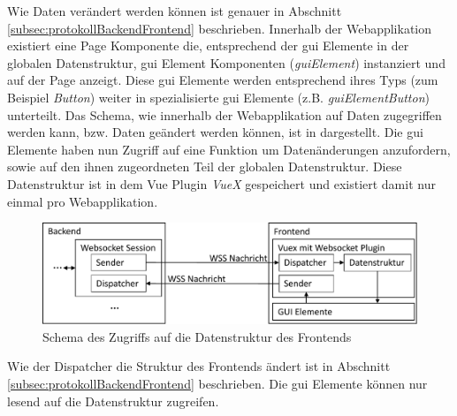 Wie Daten verändert werden können ist genauer in Abschnitt \ref{subsec:protokollBackendFrontend} beschrieben.
Innerhalb der Webapplikation existiert eine Page Komponente die, entsprechend der \ac{gui} Elemente in der globalen Datenstruktur, 
\ac{gui} Element Komponenten (\emph{guiElement}) instanziert und auf der Page anzeigt.
Diese \ac{gui} Elemente werden entsprechend ihres Typs (zum Beispiel \emph{Button}) weiter in spezialisierte \ac{gui} Elemente (z.B. \emph{guiElementButton}) unterteilt.
Das Schema, wie innerhalb der Webapplikation auf Daten zugegriffen werden kann, bzw. Daten geändert werden können,
ist in  dargestellt.
Die \ac{gui} Elemente haben nun Zugriff auf eine Funktion um Datenänderungen anzufordern, 
sowie auf den ihnen zugeordneten Teil der globalen Datenstruktur.
Diese Datenstruktur ist in dem Vue Plugin \emph{VueX} gespeichert und existiert damit nur einmal pro Webapplikation.  
\begin{figure}[ht]
  \centering
  \includegraphics[width=\textwidth]{content/hauptteil/systemEntwurf/res/datenzugriffFrontend.pdf}
  \caption[Datenzugriff innerhalb des Frontends]{Schema des Zugriffs auf die Datenstruktur des Frontends}
  \label{fig:dataFlowFrontend}
\end{figure}
Wie der Dispatcher die Struktur des Frontends ändert ist in Abschnitt \ref{subsec:protokollBackendFrontend} beschrieben.
Die \ac{gui} Elemente können nur lesend auf die Datenstruktur zugreifen.


